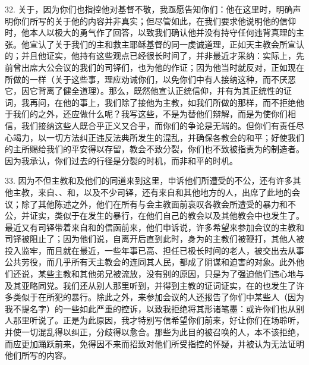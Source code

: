 32. 关于，因为你们也指控他对基督不敬，我亟愿告知你们：他在这里时，明确声明你们所写的关于他的内容并非真实；但尽管如此，在我们要求他说明他的信仰时，他本人以极大的勇气作了回答，以致我们确认他并没有持守任何违背真理的主张。他宣认了关于我们的主和救主耶稣基督的同一虔诚道理，正如天主教会所宣认的；并且他证实，他持有这些观点已经很长时间了，并非最近才采纳：实际上，先前曾出席大公会议的我们的司铎们，也为他的作证；因为他当时就反对，正如现在所做的一样（关于这些事，理应劝诫你们，以免你们中有人接纳这种，而不厌恶它，因它背离了健全道理）。那么，既然他宣认正统信仰，并有为其正统性的证词，我再问，在他的事上，我们除了接他为主教，如我们所做的那样，而不拒绝他于我们的之外，还应做什么呢？我写这些，不是为替他们辩解，而是为使你们相信，我们接纳这些人既合乎正义又合乎，而你们的争论是无端的。但你们有责任尽心竭力，以一切方法纠正违反法典所发生的混乱，并确保各教会的和平；好使我们的主所赐给我们的平安得以存留，教会不致分裂，你们也不致被指责为的制造者。因为我承认，你们过去的行径是分裂的时机，而非和平的时机。\par

33. 因为不但主教和及他们的同道来到这里，申诉他们所遭受的不公，还有许多其他主教，来自、、和，以及不少司铎，还有来自和其他地方的人，出席了此地的会议；除了其他陈述之外，他们在所有与会主教面前哀叹各教会所遭受的暴力和不公，并证实，类似于在发生的暴行，在他们自己的教会以及其他教会中也发生了。最近又有司铎带着来自和的信函前来，他们申诉说，许多希望来参加会议的主教和司铎被阻止了；因为他们说，自离开后直到此时，身为的主教们被鞭打，其他人被投入监牢，而且就在最近，一些年事已高、担任已极长时间的老人，被交出去从事公共劳役，而几乎所有天主教会的连同其人民，都成了阴谋和迫害的对象。此外他们还说，某些主教和其他弟兄被流放，没有别的原因，只是为了强迫他们违心地与及其亚略同党。我们还从别人那里听到，并得到主教的证词证实，在的也发生了许多类似于在所犯的暴行。除此之外，来参加会议的人还报告了你们中某些人（因为我不提名字）的一些如此严重的控诉，以致我拒绝将其形诸笔墨：或许你们也从别人那里听说了。正是为此原因，我才特别写信希望你们前来，好让你们在场聆听，并使一切混乱得以纠正，分歧得以愈合。那些为此目的被召唤的人，本不该拒绝，而应更加踊跃前来，免得因不来而招致对他们所受指控的怀疑，并被认为无法证明他们所写的内容。\par

